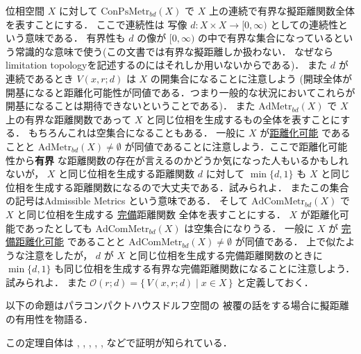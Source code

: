 \documentclass[leqno, a4paper, 12pt]{jsarticle}
\numberwithin{equation}{section}
\newcommand{\yocovfont}[1]{\mathscr{#1}}
\newcommand{\yocbmet}[1]{\mathrm{ConPsMetr}_{bd}(#1)}
\newcommand{\yocbamet}[1]{\mathrm{AdMetr}_{bd}(#1)}
\newcommand{\yocbacmet}[1]{\mathrm{AdComMetr}_{bd}(#1)}
\newcommand{\yoball}[3]{V(#1, #2; #3)}
\newcommand{\yoballfam}[2]{\yocovfont{O}(#1; #2)}
\begin{document}
位相空間
$X$
に対して
$\yocbmet{X}$
で
$X$
上の連続で有界な擬距離関数全体を表すことにする．
ここで連続性は
写像
$d\colon X\times X\to [0, \infty)$
としての連続性という意味である．
有界性も
$d$
の像が
$[0, \infty)$
の中で有界な集合になっているという常識的な意味で使う(この文書では有界な擬距離しか扱わない．
なぜならlimitation topologyを記述するのにはそれしか用いないからである)．
また
$d$
が連続であるとき
$\yoball{x}{r}{d}$
は
$X$
の開集合になることに注意しよう
(開球全体が開基になると距離化可能性が同値である．つまり一般的な状況においてこれらが開基になることは期待できないということである)．
また
$\yocbamet{X}$
で
$X$
上の有界な距離関数であって
$X$
と同じ位相を生成するもの全体を表すことにする．
もちろんこれは空集合になることもある．
一般に
$X$
が\underline{距離化可能}
であることと
$\yocbamet{X}\neq \emptyset$
が同値であることに注意しよう．ここで距離化可能性から\textbf{有界}
な距離関数の存在が言えるのかどうか気になった人もいるかもしれないが，
$X$
と同じ位相を生成する距離関数
$d$
に対して
$\min\{d, 1\}$
も
$X$
と同じ位相を生成する距離関数になるので大丈夫である．試みられよ．
またこの集合の記号はAdmissible Metrics という意味である．
そして
$\yocbacmet{X}$
で
$X$
と同じ位相を生成する
\underline{完備}距離関数
全体を表すことにする．
$X$
が距離化可能であったとしても
$\yocbacmet{X}$
は空集合になりうる．
一般に
$X$
が
\underline{完備距離化可能}
であることと
$\yocbacmet{X}\neq \emptyset$
が同値である．
上で似たような注意をしたが，
$d$
が
$X$
と同じ位相を生成する完備距離関数のときに
$\min\{d, 1\}$
も同じ位相を生成する有界な完備距離関数になることに注意しよう．
試みられよ．
また
$\yoballfam{r}{d}=\{\, \yoball{x}{r}{d}\mid x\in X\, \}$
と定義しておく．



以下の命題はパラコンパクトハウスドルフ空間の
被覆の話をする場合に擬距離の有用性を物語る．

この定理自体は
\cite[Theorem 7.4]{MR0002515}, 
 \cite[Remark 4]{MR3099433}, 
  \cite[Theorem 14]{MR0170323}, 
  \cite[Metrization Lemma 12, p.185]{MR0370454}, 
  \cite[Theorem 2.1]{zbMATH08044756}, 
  \cite[定理16.4]{kodamanagami}
  などで証明が知られている．
\end{document}

